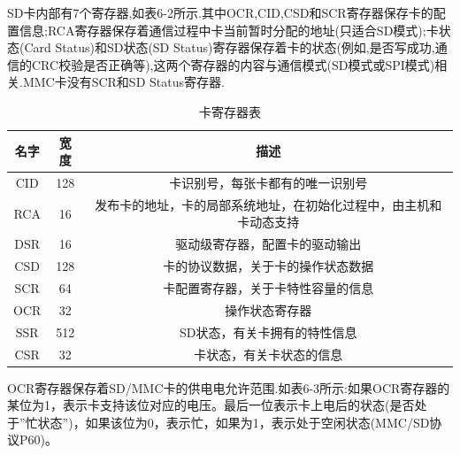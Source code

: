 SD卡内部有7个寄存器,如表6-2所示.其中OCR,CID,CSD和SCR寄存器保存卡的配置信息;RCA寄存器保存着通信过程中卡当前暂时分配的地址(只适合SD模式);卡状态(Card Status)和SD状态(SD Status)寄存器保存着卡的状态(例如,是否写成功,通信的CRC校验是否正确等),这两个寄存器的内容与通信模式(SD模式或SPI模式)相关.MMC卡没有SCR和SD Status寄存器.\\
\begin{table}
    \centering
\begin{tabular}{|c|c|c|}    

    \hline
    名字	&宽度	&描述\\
    \hline
    CID	&128	&卡识别号，每张卡都有的唯一识别号\\
    \hline
    RCA	&16	&发布卡的地址，卡的局部系统地址，在初始化过程中，由主机和卡动态支持\\
    \hline
    DSR	&16&	驱动级寄存器，配置卡的驱动输出\\
    \hline
    CSD	&128&	卡的协议数据，关于卡的操作状态数据\\
    \hline
    SCR	&64	&卡配置寄存器，关于卡特性容量的信息\\
    \hline
    OCR	&32	&操作状态寄存器\\
    \hline
    SSR	&512&	SD状态，有关卡拥有的特性信息\\
    \hline
    CSR	&32	&卡状态，有关卡状态的信息\\
    \hline
\end{tabular}
\caption{卡寄存器表}
\end{table}
OCR寄存器保存着SD/MMC卡的供电电允许范围.如表6-3所示:如果OCR寄存器的某位为1，表示卡支持该位对应的电压。最后一位表示卡上电后的状态(是否处于”忙状态”)，如果该位为0，表示忙，如果为1，表示处于空闲状态(MMC/SD协议P60)。\\

